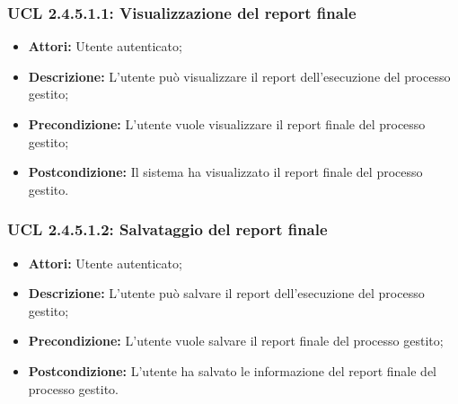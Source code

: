 \hypertarget{L2.4.5.1.1}{}
\subsubsection{UCL 2.4.5.1.1: Visualizzazione del report finale}
\begin{itemize}
\item \textbf{Attori:} Utente autenticato;
\item \textbf{Descrizione:} L'utente può visualizzare il report dell'esecuzione del processo gestito;
\item \textbf{Precondizione:} L'utente vuole visualizzare il report finale del processo gestito;
\item \textbf{Postcondizione:} Il sistema ha visualizzato il report finale del processo gestito.
\end{itemize}

\hypertarget{L2.4.5.1.2}{}
\subsubsection{UCL 2.4.5.1.2: Salvataggio del report finale}
\begin{itemize}
\item \textbf{Attori:} Utente autenticato;
\item \textbf{Descrizione:} L'utente può salvare il report dell'esecuzione del processo gestito;
\item \textbf{Precondizione:} L'utente vuole salvare il report finale del processo gestito;
\item \textbf{Postcondizione:} L'utente ha salvato le informazione del report finale del processo gestito.
\end{itemize}

\hypertarget{L2.4.5.2}{}

